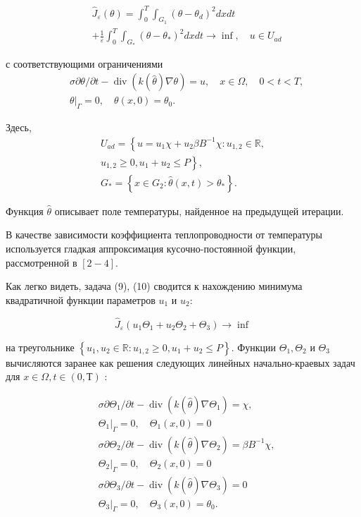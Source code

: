 \documentclass[10pt]{article}
\begin{document}
\[
\begin{aligned}
&\widehat{J}_{\varepsilon}(\theta)=\int_{0}^{T} \int_{G_{1}}\left(\theta-\theta_{d}\right)^{2} d x d t \\
&+\frac{1}{\varepsilon} \int_{0}^{T}
\int_{G_{*}}\left(\theta-\theta_{*}\right)^{2} d x d t \rightarrow \inf , \quad u \in U_{a d}
\end{aligned}
\]

с соответствующими ограничениями
\[
\begin{aligned}
&\sigma \partial \theta / \partial t-\operatorname{div}(k(\widehat{\theta})
 \nabla \theta)=u, \quad x \in \Omega, \quad 0<t<T, \\
&\left.\theta\right|_{\Gamma}=0, \quad \theta(x, 0)=\theta_{0} .
\end{aligned}
\]

Здесь,
\[
\begin{gathered}
U_{a d}=\left\{u=u_{1} \chi+u_{2} \beta B^{-1} \chi: u_{1,2} \in \mathbb{R},\right. \\
\left.u_{1,2} \geq 0, u_{1}+u_{2} \leq P\right\}, \\
G_{*}=\left\{x \in G_{2}: \hat{\theta}(x, t)>\theta_{*}\right\} .
\end{gathered}
\]

Функция $\widehat{\theta}$ описывает поле температуры, найденное на предыдущей итерации.

В качестве зависимости коэффициента теплопроводности от температуры используется
гладкая аппроксимация кусочно-постоянной функции, рассмотренной в $[2-4]$.

Как легко видеть, задача (9), (10) сводится к нахождению минимума
квадратичной функции параметров $u_{1}$ и $u_{2}$:


\[
\widehat{J}_{\varepsilon}\left(u_{1} \Theta_{1}+u_{2} \Theta_{2}+\Theta_{3}\right) \rightarrow \inf
\]

на треугольнике  $\left\{u_{1}, u_{2} \in \mathbb{R}: u_{1,2} \geq 0, u_{1}+u_{2} \leq P\right\}$.
Функции $\Theta_{1}, \Theta_{2}$ и $\Theta_{3}$ вычисляются заранее как решения следующих линейных
начально-краевых задач для $x \in \Omega, t \in(0 , Т)$ :


\[
\begin{aligned}
&\sigma \partial \Theta_{1} / \partial t-\operatorname{div}\left(k(\widehat{\theta})
\nabla \Theta_{1}\right)=\chi, \\
&\left.\Theta_{1}\right|_{\Gamma}=0, \quad \Theta_{1}(x, 0)=0 \\
&\sigma \partial \Theta_{2} / \partial t-\operatorname{div}\left(k(\widehat{\theta})
\nabla \Theta_{2}\right)=\beta B^{-1} \chi, \\
&\left.\Theta_{2}\right|_{\Gamma}=0, \quad \Theta_{2}(x, 0)=0 \\
&\sigma \partial \Theta_{3} / \partial t-\operatorname{div}\left(k(\widehat{\theta})
\nabla \Theta_{3}\right)=0 \\
&\left.\Theta_{3}\right|_{\Gamma}=0, \quad \Theta_{3}(x, 0)=\theta_{0} .
\end{aligned}
\]
\end{document}
